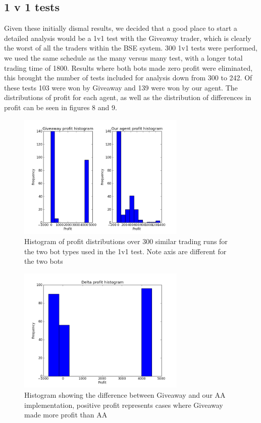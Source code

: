 \documentclass{acm_proc_article-sp}
\begin{document}
\subsection{1 v 1 tests} Given these initially dismal results, we decided that
a good place to start a detailed analysis would be a 1v1 test with the Giveaway
trader, which is clearly the worst of all the traders within the BSE system.
300 1v1 tests were performed, we used the same schedule as the many versus many
test, with a longer total trading time of 1800. Results where both bots made
zero profit were eliminated, this brought the number of tests included for
analysis down from 300 to 242. Of these tests 103 were won by Giveaway and 139
were won by our agent. The distributions of profit for each agent, as well as
the distribution of differences in profit can be seen in figures 8 and 9.

\begin{figure}[h!] \includegraphics[width=80mm]{giveaway_1_v_1.png}
\caption{Histogram of profit distributions over 300 similar trading runs for
the two bot types used in the 1v1 test. Note axis are different for the two
bots} \end{figure}

\begin{figure}[h!] \includegraphics[width=80mm]{giveaway_1_v_1_delta.png}
\caption {Histogram showing the difference between Giveaway and our AA implementation,
positive profit represents cases where Giveaway made more profit than AA}
\end{figure}
\end{document}
